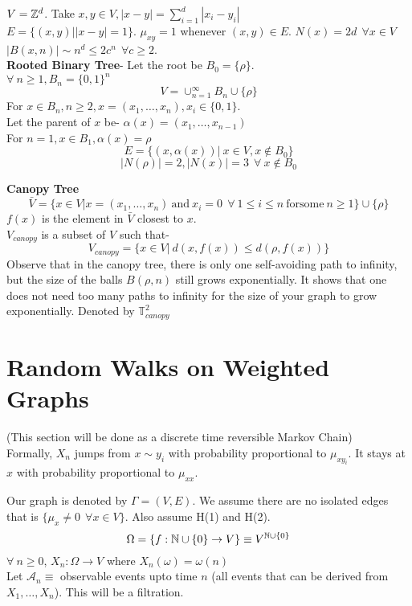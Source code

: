\documentclass[main]{subfiles}
\begin{document}
\ex $V=\mathbb Z^d$. Take $x,y \in V, |x-y|=\sum_{i=1}^d |x_i -y_i|$\\
$E=\{(x,y) | |x-y|=1\}$. $\mu_{xy}=1$ whenever $(x,y) \in E$. $N(x)= 2d ~~ \forall x \in V$
\\
$|B(x,n)| \sim n^d \leq 2 c^n ~~ \forall c \geq 2$. \\
\ex \textbf{Rooted Binary Tree}-
Let the root be $B_0 =\{ \rho \}$.\\
$\forall~ n \geq 1, B_n= \{0,1\}^n$ \\
$$ V= \cup_{n=1}^{\infty} B_n \cup \{\rho \}$$
For $x \in B_n, n \geq 2, x=(x_1, \ldots, x_n), x_i \in \{0,1\}$. \\
Let the parent of $x$ be- $\alpha(x)=(x_1, \ldots, x_{n-1})$ \\
For $n=1, x \in B_1, \alpha(x)=\rho$ \\
$$E=\{(x, \alpha(x)) |~ x\in V, x \notin B_0\}$$
$$|N(\rho)|=2, |N(x)|=3 ~~ \forall~ x \notin B_0$$

\textbf{Canopy Tree}\\
$$\bar{V}=\{x \in V | x=(x_1, \ldots, x_n) ~\mathrm{and}~ x_i=0 ~~\forall~ 1 \leq i \leq n ~\mathrm{for some}~ n \geq 1\} \cup \{ \rho \}$$
$f(x)$ is the element in $\bar{V}$ closest to $x$.\\
$V_{canopy}$ is a subset of $V$ such that-
$$V_{canopy}=\{x \in V |~ d(x,f(x)) \leq d(\rho, f(x))\}$$
Observe that in the canopy tree, there is only one self-avoiding path to infinity, but the size of the balls $B(\rho ,n)$ still grows exponentially. It shows that one does not need too many paths to infinity for the size of your graph to grow exponentially. Denoted by $\mathbb{T}^2_{canopy}$ \\


\section{Random Walks on Weighted Graphs}
 (This section will be done as a discrete time reversible Markov Chain)\\
Formally, $X_n$ jumps from $x \sim y_i$ with probability proportional to $\mu_{xy_i}$. It stays at $x$ with probability proportional to $\mu_{xx}$.

Our graph is denoted by $\Gamma=(V,E)$. We assume there are no isolated edges that is $\{\mu_x \neq 0 ~~ \forall x \in V\}$. Also assume H(1) and H(2).
$$\Omega= \{f : \mathbb N \cup \{0\} \to V\} \equiv V^{\mathbb N \cup \{0\}}$$
$\forall~ n \geq 0$, $X_n: \Omega \to V$ where $X_n(\omega)= \omega(n)$\\
Let $\mathcal{A}_n \equiv$ observable events upto time $n$ (all events that can be derived from $X_1, \ldots ,X_n$). This will be a filtration. \\
\end{document}
